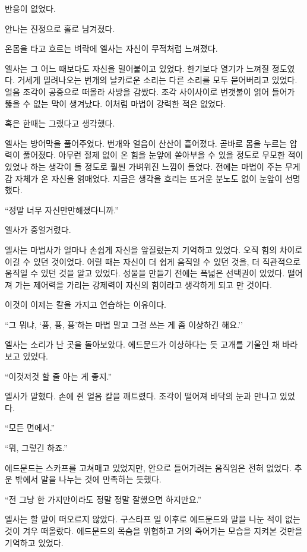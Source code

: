 반응이 없었다.

안나는 진정으로 홀로 남겨졌다.

\textbreak

온몸을 타고 흐르는 벼락에 엘사는 자신이 무적처럼 느껴졌다.

엘사는 그 어느 때보다도 자신을 밀어붙이고 있었다. 한기보다 열기가 느껴질 정도였다. 거세게 밀려나오는 번개의 날카로운 소리는 다른 소리를 모두 묻어버리고 있었다. 얼음 조각이 공중으로 떠올라 사방을 감쌌다. 조각 사이사이로 번갯불이 얽어 들어가 뚫을 수 없는 막이 생겨났다. 이처럼 마법이 강력한 적은 없었다.

혹은 한때는 그랬다고 생각했다.

엘사는 방어막을 풀어주었다. 번개와 얼음이 산산이 흩어졌다. 곧바로 몸을 누르는 압력이 풀어졌다. 아무런 절제 없이 온 힘을 눈앞에 쏟아부을 수 있을 정도로 무모한 적이 있었나 하는 생각이 들 정도로 훨씬 가벼워진 느낌이 들었다. 전에는 마법이 주는 무게감 자체가 온 자신을 얽매었다. 지금은 생각을 흐리는 뜨거운 분노도 없이 눈앞이 선명했다.

``정말 너무 자신만만해졌다니까.''

엘사가 중얼거렸다.

엘사는 마법사가 얼마나 손쉽게 자신을 앞질렀는지 기억하고 있었다. 오직 힘의 차이로 이길 수 있던 것이었다. 어릴 때는 자신이 더 쉽게 움직일 수 있던 것을, 더 직관적으로 움직일 수 있던 것을 알고 있었다. 성물을 만들기 전에는 폭넓은 선택권이 있었다. 떨어져 가는 제어력을 가리는 강제력이 자신의 힘이라고 생각하게 되고 만 것이다.

이것이 이제는 칼을 가지고 연습하는 이유이다.

``그 뭐냐, `퓽, 퓽, 퓽'하는 마법 말고 그걸 쓰는 게 좀 이상하긴 해요.''

엘사는 소리가 난 곳을 돌아보았다. 에드문드가 이상하다는 듯 고개를 기울인 채 바라보고 있었다.

``이것저것 할 줄 아는 게 좋지.''

엘사가 말했다. 손에 쥔 얼음 칼을 깨트렸다. 조각이 떨어져 바닥의 눈과 만나고 있었다.

``모든 면에서.''

``뭐, 그렇긴 하죠.''

에드문드는 스카프를 고쳐매고 있었지만, 안으로 들어가려는 움직임은 전혀 없었다. 추운 밖에서 말을 나누는 것에 만족하는 듯했다.

``전 그냥 한 가지만이라도 정말 정말 잘했으면 하지만요.''

엘사는 할 말이 떠오르지 않았다. 구스타프 일 이후로 에드문드와 말을 나눈 적이 없는 것이 겨우 떠올랐다. 에드문드의 목숨을 위협하고 거의 죽어가는 모습을 지켜본 것만을 기억하고 있었다.

